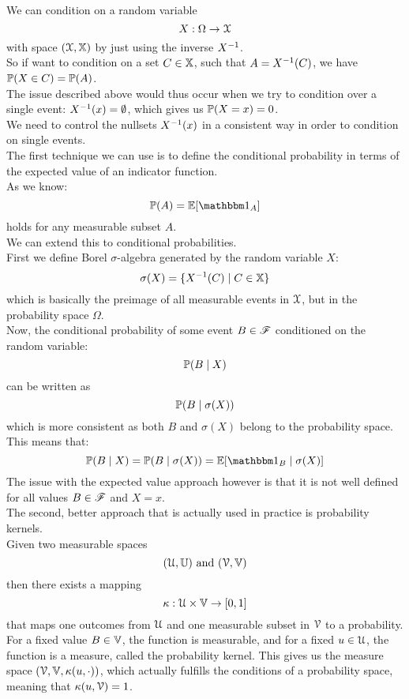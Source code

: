 \documentclass[12pt]{article}
\begin{document}
We can condition on a random variable
\[ X: \Omega \to \mathcal{X} \]
with space $(\mathcal{X}, \mathbb{X})$
by just using the inverse $X^{-1}$. \\
So if want to condition on a set $C \in \mathbb{X}$,
such that $A = X^{-1}(C)$,
we have $\mathbb{P}(X \in C) = \mathbb{P}(A)$. \\

The issue described above would thus occur
when we try to condition over a single event:
$X^{-1}(x) = \emptyset$,
which gives us $\mathbb{P}(X = x) = 0$. \\

We need to control the nullsets
$X^{-1}(x)$ in a consistent way
in order to condition on single events. \\

The first technique we can use
is to define the conditional probability
in terms of the expected value of
an indicator function. \\

As we know:
\[ \pbb(A) = \ebb[\indicator_A] \]
holds for any measurable subset $A$. \\

We can extend this to conditional
probabilities. \\

First we define Borel $\sigma$-algebra
generated by the random variable $X$:
\[ \sigma(X) = 
\{X^{-1}(C) \mid C \in \mathbb{X}\} \]
which is basically
the preimage of all measurable
events in $\mathcal{X}$,
but in the probability space $\Omega$. \\

Now, the conditional probability
of some event $B \in \mathscr{F}$
conditioned on the random variable:
\[ \mathbb{P}(B \mid X) \]
can be written as
\[ \mathbb{P}(B \mid \sigma(X)) \]
which is more consistent
as both $B$ and $\sigma(X)$
belong to the probability space. \\
This means that:
\[ \pbb(B \mid X) 
= \pbb(B \mid \sigma(X))
= \ebb[\indicator_B \mid \sigma(X)] \]
The issue with the expected
value approach however is that it is
not well defined for all values $B \in \mathscr{F}$
and $X = x$. \\

The second, better approach
that is actually used in practice is
probability kernels. \\

Given two measurable spaces
\[ (\mathcal{U}, \mathbb{U}) \text{ and } (\mathcal{V}, \mathbb{V}) \]
then there exists a mapping
\[ \kappa: \mathcal{U} \times \mathbb{V} \to [0, 1] \]
that maps one outcomes from $\mathcal{U}$
and one measurable subset in $\mathcal{V}$
to a probability. \\
For a fixed value $B \in \mathbb{V}$,
the function is measurable,
and for a fixed $u \in \mathcal{U}$,
the function is a measure,
called the probability kernel.
This gives us the measure space
$(\mathcal{V}, \mathbb{V}, \kappa(u, \cdot))$,
which actually fulfills the
conditions of a probability space,
meaning that $\kappa(u, \mathcal{V}) = 1$. \\
\end{document}

